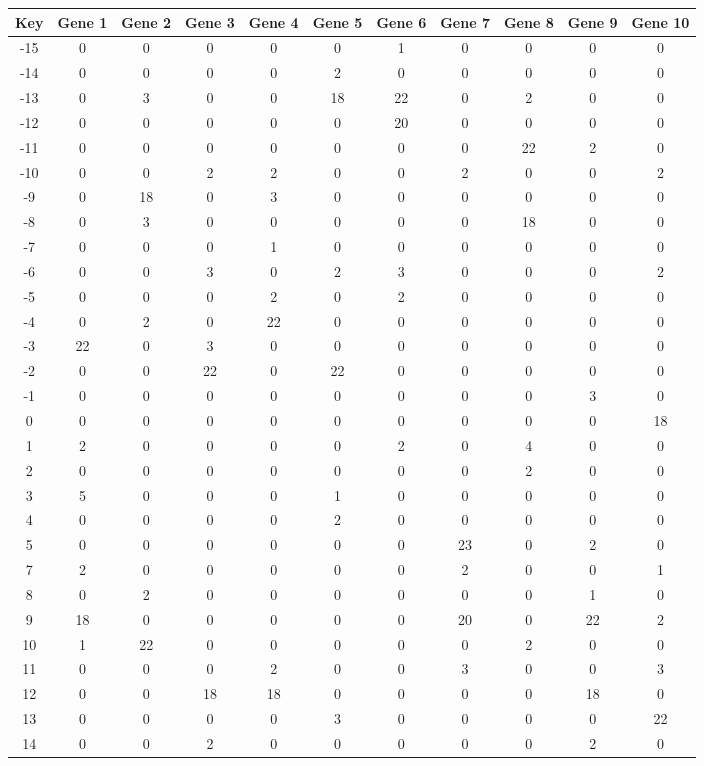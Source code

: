 \begin{tabular}{|c|c|c|c|c|c|c|c|c|c|c|}
\hline
Key & Gene 1 & Gene 2 & Gene 3 & Gene 4 & Gene 5 & Gene 6 & Gene 7 & Gene 8 & Gene 9 & Gene 10 \\
\hline
-15 & 0 & 0 & 0 & 0 & 0 & 1 & 0 & 0 & 0 & 0 \\
-14 & 0 & 0 & 0 & 0 & 2 & 0 & 0 & 0 & 0 & 0 \\
-13 & 0 & 3 & 0 & 0 & 18 & 22 & 0 & 2 & 0 & 0 \\
-12 & 0 & 0 & 0 & 0 & 0 & 20 & 0 & 0 & 0 & 0 \\
-11 & 0 & 0 & 0 & 0 & 0 & 0 & 0 & 22 & 2 & 0 \\
-10 & 0 & 0 & 2 & 2 & 0 & 0 & 2 & 0 & 0 & 2 \\
-9 & 0 & 18 & 0 & 3 & 0 & 0 & 0 & 0 & 0 & 0 \\
-8 & 0 & 3 & 0 & 0 & 0 & 0 & 0 & 18 & 0 & 0 \\
-7 & 0 & 0 & 0 & 1 & 0 & 0 & 0 & 0 & 0 & 0 \\
-6 & 0 & 0 & 3 & 0 & 2 & 3 & 0 & 0 & 0 & 2 \\
-5 & 0 & 0 & 0 & 2 & 0 & 2 & 0 & 0 & 0 & 0 \\
-4 & 0 & 2 & 0 & 22 & 0 & 0 & 0 & 0 & 0 & 0 \\
-3 & 22 & 0 & 3 & 0 & 0 & 0 & 0 & 0 & 0 & 0 \\
-2 & 0 & 0 & 22 & 0 & 22 & 0 & 0 & 0 & 0 & 0 \\
-1 & 0 & 0 & 0 & 0 & 0 & 0 & 0 & 0 & 3 & 0 \\
0 & 0 & 0 & 0 & 0 & 0 & 0 & 0 & 0 & 0 & 18 \\
1 & 2 & 0 & 0 & 0 & 0 & 2 & 0 & 4 & 0 & 0 \\
2 & 0 & 0 & 0 & 0 & 0 & 0 & 0 & 2 & 0 & 0 \\
3 & 5 & 0 & 0 & 0 & 1 & 0 & 0 & 0 & 0 & 0 \\
4 & 0 & 0 & 0 & 0 & 2 & 0 & 0 & 0 & 0 & 0 \\
5 & 0 & 0 & 0 & 0 & 0 & 0 & 23 & 0 & 2 & 0 \\
7 & 2 & 0 & 0 & 0 & 0 & 0 & 2 & 0 & 0 & 1 \\
8 & 0 & 2 & 0 & 0 & 0 & 0 & 0 & 0 & 1 & 0 \\
9 & 18 & 0 & 0 & 0 & 0 & 0 & 20 & 0 & 22 & 2 \\
10 & 1 & 22 & 0 & 0 & 0 & 0 & 0 & 2 & 0 & 0 \\
11 & 0 & 0 & 0 & 2 & 0 & 0 & 3 & 0 & 0 & 3 \\
12 & 0 & 0 & 18 & 18 & 0 & 0 & 0 & 0 & 18 & 0 \\
13 & 0 & 0 & 0 & 0 & 3 & 0 & 0 & 0 & 0 & 22 \\
14 & 0 & 0 & 2 & 0 & 0 & 0 & 0 & 0 & 2 & 0 \\
\hline
\end{tabular}
